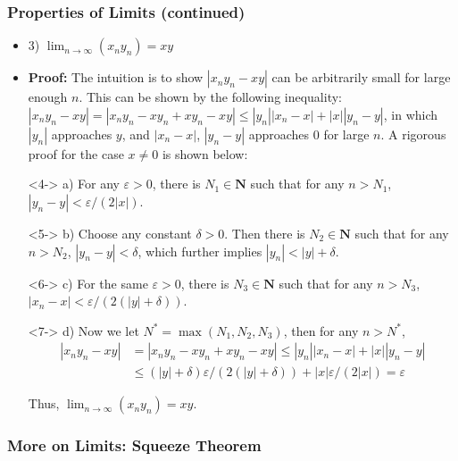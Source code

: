 \documentclass[handout]{beamer}
\begin{document}
\frame
{
  \frametitle{Properties of Limits (continued)}

   \begin{itemize} \item<1-> 3) $\lim_{n\rightarrow\infty} (x_ny_n)=xy$
    
      \item<2-> \textbf{Proof:} The intuition is to show $|x_ny_n-xy|$ can be arbitrarily small for large enough $n$. This can be shown by the following inequality: $|x_ny_n-xy|=|x_ny_n -xy_n+xy_n-xy|\leq |y_n||x_n-x|+|x| |y_n-y|$, in which $|y_n|$ approaches $y$, and $|x_n-x|$, $|y_n-y|$ approaches 0 for large $n$. A rigorous proof for the case $x\neq 0$ is shown below:
      
        \item[]<4-> a)  For any $\varepsilon>0$, there is $N_1\in \mathbf{N}$ such that for any $n>N_1$, $|y_n-y|<\varepsilon/(2|x|)$.
        \item[]<5-> b) Choose any constant $\delta>0$. Then there is $N_2\in \mathbf{N}$ such that for any $n>N_2$, $|y_n-y|<\delta$, which further implies $|y_n|<|y|+\delta$. 
        \item[]<6-> c) For the same $\varepsilon>0$, there is $N_3\in \mathbf{N}$ such that for any $n>N_3$, $|x_n-x|<\varepsilon/(2(|y|+\delta))$.
        \item[]<7-> d) Now we let $N^*=\max(N_1, N_2,N_3)$, then for any $n>N^*$,       
       \begin{align*}|x_ny_n-xy|& =|x_ny_n -xy_n+xy_n-xy|\leq |y_n||x_n-x|+|x| |y_n-y| \\ & \leq (|y|+\delta) \varepsilon/(2(|y|+\delta))+|x| \varepsilon/(2|x|)=\varepsilon\end{align*}

        
        Thus, $\lim_{n\rightarrow\infty} (x_ny_n)=xy$.
        
        
  \end{itemize}
}





\subsubsection{More on Limits: Squeeze Theorem}
\end{document}
